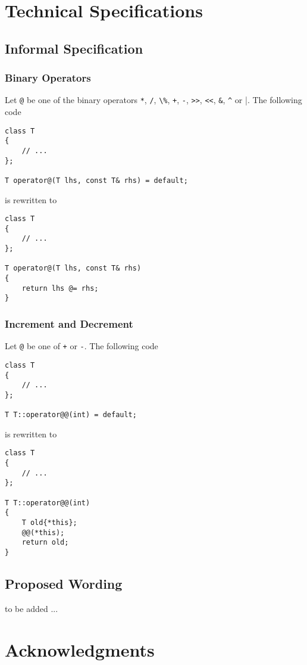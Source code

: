 \documentclass[a4paper,11pt,final]{article}
\numberwithin{equation}{subsection}
\begin{document}
\section{Technical Specifications}
\subsection{Informal Specification}
\subsubsection{Binary Operators}
Let \verb|@| be one of the binary operators \verb|*|, \verb|/|, \verb|\%|, \verb|+|, \verb|-|, \verb|>>|, \verb|<<|, \verb|&|, \verb|^| or \verb|||. The following code
\begin{verbatim}
class T
{
    // ...
};

T operator@(T lhs, const T& rhs) = default;
\end{verbatim}
is rewritten to 
\begin{verbatim}
class T
{
    // ...
};

T operator@(T lhs, const T& rhs)
{
    return lhs @= rhs;
}
\end{verbatim}

\subsubsection{Increment and Decrement}
Let \verb|@| be one of \verb|+| or \verb|-|. 
The following code
\begin{verbatim}
class T
{
    // ...
};

T T::operator@@(int) = default;
\end{verbatim}
is rewritten to 
\begin{verbatim}
class T
{
    // ...
};

T T::operator@@(int)
{
    T old{*this};
    @@(*this);
    return old;
}
\end{verbatim}

\subsection{Proposed Wording}
to be added ...

\section{Acknowledgments}



\end{document}
